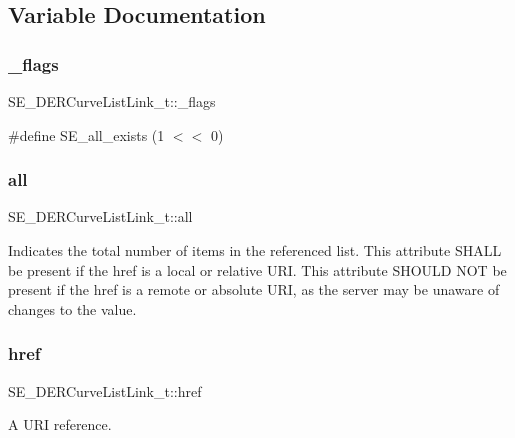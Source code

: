 \subsection{Variable Documentation}
\mbox{\label{group__DERCurveListLink_gacdf332cf076235a033cec9d50958c3c5}} 
\subsubsection{\texorpdfstring{\+\_\+flags}{\_flags}}
{\footnotesize\ttfamily S\+E\+\_\+\+D\+E\+R\+Curve\+List\+Link\+\_\+t\+::\+\_\+flags}

\#define S\+E\+\_\+all\+\_\+exists (1 $<$$<$ 0) \mbox{\label{group__DERCurveListLink_gaa089d77a177cf9db75d2c3d09016bd69}} 
\subsubsection{\texorpdfstring{all}{all}}
{\footnotesize\ttfamily S\+E\+\_\+\+D\+E\+R\+Curve\+List\+Link\+\_\+t\+::all}

Indicates the total number of items in the referenced list. This attribute S\+H\+A\+LL be present if the href is a local or relative U\+RI. This attribute S\+H\+O\+U\+LD N\+OT be present if the href is a remote or absolute U\+RI, as the server may be unaware of changes to the value. \mbox{\label{group__DERCurveListLink_ga78be8068f0ce6e8e040f5d59a71335fc}} 
\subsubsection{\texorpdfstring{href}{href}}
{\footnotesize\ttfamily S\+E\+\_\+\+D\+E\+R\+Curve\+List\+Link\+\_\+t\+::href}

A U\+RI reference. 